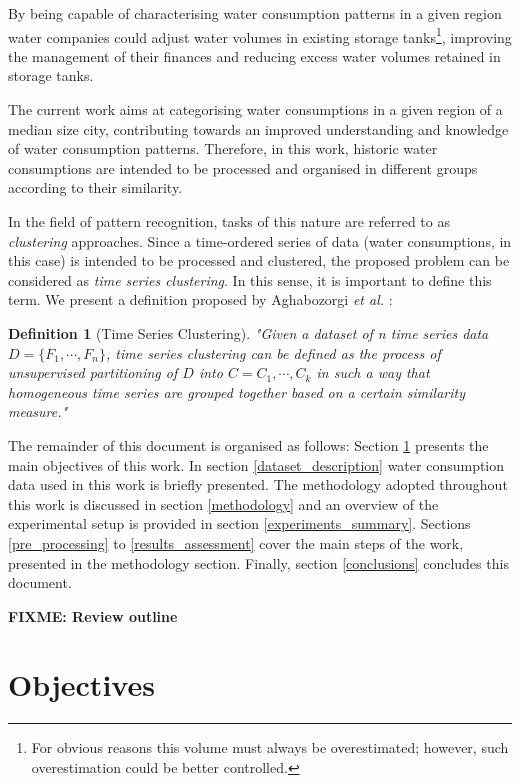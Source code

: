 \documentclass[9pt,journal,compsoc]{IEEEtran}
\newtheorem{mydef}{Definition}
\begin{document}
By being capable of characterising water consumption patterns in a given region water companies could adjust water volumes in existing storage tanks\footnote{For obvious reasons this volume must always be overestimated; however, such overestimation could be better controlled.}, improving the management of their finances and reducing excess water volumes retained in storage tanks.

The current work aims at categorising water consumptions in a given region of a median size city, contributing towards an improved understanding and knowledge of water consumption patterns. Therefore, in this work, historic water consumptions are intended to be processed and organised in different groups according to their similarity.

In the field of pattern recognition, tasks of this nature are referred to as \emph{clustering} approaches. Since a time-ordered series of data (water consumptions, in this case) is intended to be processed and clustered, the proposed problem can be considered as \emph{time series clustering}. In this sense, it is important to define this term. We present a definition proposed by Aghabozorgi \emph{et al.} \cite{aghabozorgi2015time}:

\begin{mydef}[Time Series Clustering]
	"Given a dataset of n time series data $D = \{F_{1}, \cdots , F_{n}\}$, time series clustering can be defined as the process of unsupervised partitioning of $D$ into $C = {C_{1}, \cdots , C_{k}}$ in such a way that homogeneous time series are grouped together based on a certain similarity measure."
\end{mydef}

The remainder of this document is organised as follows: Section \ref{objectives} presents the main objectives of this work. In section \ref{dataset_description} water consumption data used in this work is briefly presented. The methodology adopted throughout this work is discussed in section \ref{methodology} and an overview of the experimental setup is provided in section \ref{experiments_summary}. Sections \ref{pre_processing} to \ref{results_assessment} cover the main steps of the work, presented in the methodology section. Finally, section \ref{conclusions} concludes this document.

\textbf{FIXME: Review outline}

\section{Objectives}
\label{objectives}
\end{document}
